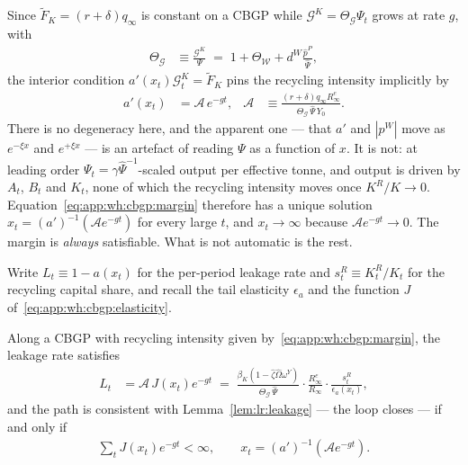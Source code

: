 Since $\tilde F_K=\left(r+\delta\right)q_\infty$ is constant on a CBGP while $\mathcal G^K=\Theta_{\mathcal G}\Psi_t$ grows at rate $g$, with
\begin{align}
\Theta_{\mathcal G} &\equiv \frac{\mathcal G^K}{\Psi} \;=\; 1+\Theta_{\mathcal W}+d^W\frac{\hat p^P}{\hat\Psi},
\label{eq:app:wh:cbgp:ThetaG}
\end{align}
the interior condition $a'\left(x_t\right)\mathcal G^K_t=\tilde F_K$ pins the recycling intensity implicitly by
\begin{align}
a'\left(x_t\right) &= \mathcal A\,e^{-gt},
&
\mathcal A &\equiv \frac{\left(r+\delta\right)q_\infty R^e_\infty}{\Theta_{\mathcal G}\,\hat\Psi\,Y_0}.
\label{eq:app:wh:cbgp:margin}
\end{align}
There is no degeneracy here, and the apparent one --- that $a'$ and $\left|p^W\right|$ move as $e^{-\xi x}$ and $e^{+\xi x}$ --- is an artefact of reading $\Psi$ as a function of $x$. It is not: at leading order $\Psi_t=\gamma\hat\Psi^{-1}$-scaled output per effective tonne, and output is driven by $A_t$, $B_t$ and $K_t$, none of which the recycling intensity moves once $K^R/K\to0$. Equation~\eqref{eq:app:wh:cbgp:margin} therefore has a unique solution $x_t=\left(a'\right)^{-1}\!\left(\mathcal Ae^{-gt}\right)$ for every large $t$, and $x_t\to\infty$ because $\mathcal Ae^{-gt}\to0$. The margin is \emph{always} satisfiable. What is not automatic is the rest.

Write $L_t\equiv1-a\left(x_t\right)$ for the per-period leakage rate and $s^R_t\equiv K^R_t/K_t$ for the recycling capital share, and recall the tail elasticity $\epsilon_a$ and the function $J$ of~\eqref{eq:app:wh:cbgp:elasticity}.

\begin{proposition}\label{prop:app:wh:closure}
Along a CBGP with recycling intensity given by~\eqref{eq:app:wh:cbgp:margin}, the leakage rate satisfies
\begin{align}
L_t &= \mathcal A\,J\left(x_t\right)e^{-gt}
\;=\; \frac{\beta_K\left(1-\hat\zeta\hat\Omega\omega^Y\right)}{\Theta_{\mathcal G}\,\hat\Psi}\cdot\frac{R^{e}_\infty}{R_\infty}\cdot\frac{s^R_t}{\epsilon_a\left(x_t\right)} ,
\label{eq:app:wh:cbgp:leak}
\end{align}
and the path is consistent with Lemma~\ref{lem:lr:leakage} --- the loop closes --- if and only if
\begin{align}
\sum_{t}J\left(x_t\right)e^{-gt} <\infty,
\qquad x_t=\left(a'\right)^{-1}\!\left(\mathcal Ae^{-gt}\right).
\label{eq:app:wh:cbgp:criterion}
\end{align}
\end{proposition}


